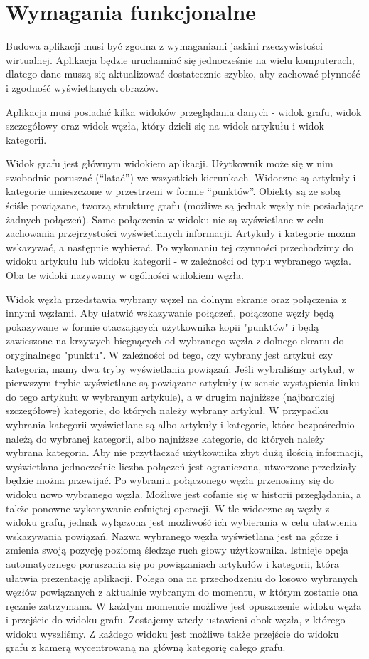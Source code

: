 \section{Wymagania funkcjonalne}
Budowa aplikacji musi być zgodna z wymaganiami jaskini rzeczywistości wirtualnej. Aplikacja będzie uruchamiać się jednocześnie na wielu komputerach, dlatego dane muszą się aktualizować dostatecznie szybko, aby zachować płynność i zgodność wyświetlanych obrazów.

Aplikacja musi posiadać kilka widoków przeglądania danych - widok grafu, widok szczegółowy oraz widok węzła, który dzieli się na widok artykułu i widok kategorii.

Widok grafu jest głównym widokiem aplikacji. Użytkownik może się w nim swobodnie poruszać (“latać”) we wszystkich kierunkach. Widoczne są artykuły i kategorie umieszczone w przestrzeni w formie “punktów”. Obiekty są ze sobą ściśle powiązane, tworzą strukturę grafu (możliwe są jednak węzły nie posiadające żadnych połączeń). Same połączenia w widoku nie są wyświetlane w celu zachowania przejrzystości wyświetlanych informacji. Artykuły i kategorie można wskazywać, a następnie wybierać. Po wykonaniu tej czynności przechodzimy do widoku artykułu lub widoku kategorii - w zależności od typu wybranego węzła. Oba te widoki nazywamy w ogólności widokiem węzła.

Widok węzła przedstawia wybrany węzeł na dolnym ekranie oraz połączenia z innymi węzłami. Aby ułatwić wskazywanie połączeń, połączone węzły będą pokazywane w formie otaczających użytkownika kopii "punktów" i będą zawieszone na krzywych biegnących od wybranego węzła z dolnego ekranu do oryginalnego "punktu". W zależności od tego, czy wybrany jest artykuł czy kategoria, mamy dwa tryby wyświetlania powiązań. Jeśli wybraliśmy artykuł, w pierwszym trybie wyświetlane są powiązane artykuły (w sensie wystąpienia linku do tego artykułu w wybranym artykule), a w drugim najniższe (najbardziej szczegółowe)  kategorie, do których należy wybrany artykuł. W przypadku wybrania kategorii wyświetlane są albo artykuły i kategorie, które bezpośrednio należą do wybranej kategorii, albo najniższe kategorie, do których należy wybrana kategoria. Aby nie przytłaczać użytkownika zbyt dużą ilością informacji, wyświetlana jednocześnie liczba połączeń jest ograniczona, utworzone przedziały będzie można przewijać. Po wybraniu połączonego węzła przenosimy się do widoku nowo wybranego węzła. Możliwe jest cofanie się w historii przeglądania, a także ponowne wykonywanie cofniętej operacji. W tle widoczne są węzły z widoku grafu, jednak wyłączona jest możliwość ich wybierania w celu ułatwienia wskazywania powiązań. Nazwa wybranego węzła wyświetlana jest na górze i zmienia swoją pozycję poziomą śledząc ruch głowy użytkownika. Istnieje opcja automatycznego poruszania się po powiązaniach artykułów i kategorii, która ułatwia prezentację aplikacji. Polega ona na przechodzeniu do losowo wybranych węzłów powiązanych z aktualnie wybranym do momentu, w którym zostanie ona ręcznie zatrzymana. W każdym momencie możliwe jest opuszczenie widoku węzła i przejście do widoku grafu. Zostajemy wtedy ustawieni obok węzła, z którego widoku wyszliśmy. Z każdego widoku jest możliwe także przejście do widoku grafu z kamerą wycentrowaną na główną kategorię całego grafu.

